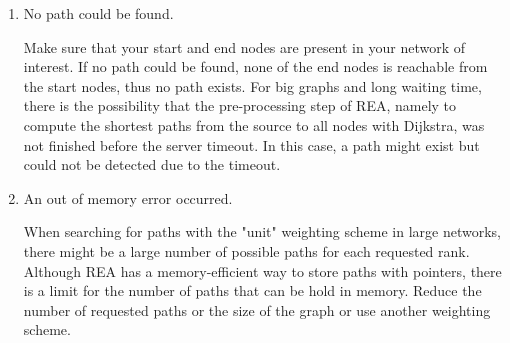 \begin{enumerate}

\item No path could be found.

 Make sure that your start and end nodes are present in your network of interest. If no path could be found, none
 of the end nodes is reachable from the start nodes, thus no path exists. For big graphs and long waiting time, there is the possibility that
 the pre-processing step of REA, namely to compute the shortest paths from the source to all nodes with Dijkstra, was not finished before
 the server timeout. In this case, a path might exist but could not be detected due to the timeout.

\item An out of memory error occurred.

 When searching for paths with the "unit" weighting scheme in large networks, there might be
 a large number of possible paths for each requested rank.  Although REA has a memory-efficient
 way to store paths with pointers, there is a limit for the number of paths that can be hold in memory.
 Reduce the number of requested paths or the size of the graph or use another weighting scheme.

\end{enumerate}







